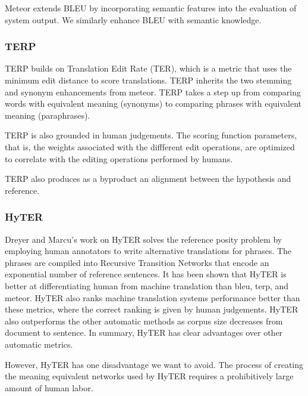 
Meteor extends BLEU by incorporating semantic features into the evaluation of system output. 
We similarly enhance BLEU with semantic knowledge. 

\subsubsection{TERP}
\label{sec:terp}


TERP builds on Translation Edit Rate (TER), which is a metric that uses the minimum edit distance to score translations. 
TERP inherits the two stemming and synonym enhancements from meteor. 
TERP takes a step up from comparing words with equivalent meaning    (synonyms) to comparing phrases with equivalent meaning (paraphrases). 

TERP is also grounded in human judgements. 
The scoring function parameters, that is, the weights associated with the diffferent edit operations, are optimized  to correlate with the  editing operations performed by humans. 

TERP also produces as a byproduct an alignment between the hypothesis and reference. 

\subsubsection{HyTER}
\label{sec:hyter}


Dreyer and Marcu's work  on HyTER  solves the reference posity problem by employing human annotators to write alternative translations for phrases. 
The phrases are compiled into Recursive Transition Networks that encode an exponential number of reference sentences. 
It has been shown that HyTER is better at differentiating human from machine translation than bleu, terp, and meteor. 
HyTER also ranks machine translation systems performance better than these metrics, where the correct ranking is given by human judgements. 
HyTER also outperforms the other automatic methods as corpus size decreases   from document to sentence. 
In summary, HyTER has clear advantages over other automatic metrics. 

However,   HyTER has one disadvantage we want to avoid. 
The process of creating the meaning equivalent networks used by HyTER requires a prohibitively large amount of human labor. 

